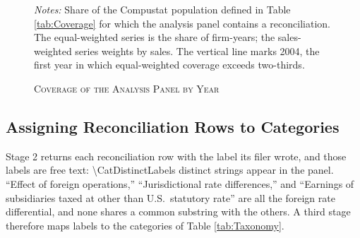 \documentclass[11pt,letterpaper]{article}
\newcommand{\CountNum}[1]{\num[round-mode=places,round-precision=0]{#1}}
\newcommand{\Inputs}{Inputs}
\begin{document}
\begin{figure}[!tp]
\centering
\caption{\textsc{Coverage of the Analysis Panel by Year}}
\label{fig:CoverageByYear}

\bigskip
\begin{minipage}{0.95\textwidth}
\footnotesize{\textit{Notes:} Share of the Compustat population defined in
Table \ref{tab:Coverage} for which the analysis panel contains a
reconciliation. The equal-weighted series is the share of firm-years; the
sales-weighted series weights by sales. The vertical line marks 2004, the
first year in which equal-weighted coverage exceeds two-thirds.}
\end{minipage}

\bigskip
\bigskip
\end{figure}

\subsection{Assigning Reconciliation Rows to Categories\label{app:categories}}

Stage 2 returns each reconciliation row with the label its filer wrote,
and those labels are free text: \CountNum{\CatDistinctLabels} distinct
strings appear in the panel. ``Effect of foreign operations,''
``Jurisdictional rate differences,'' and ``Earnings of subsidiaries
taxed at other than U.S.\ statutory rate'' are all the foreign rate
differential, and none shares a common substring with the others. A
third stage therefore maps labels to the categories of Table
\ref{tab:Taxonomy}.
\end{document}
